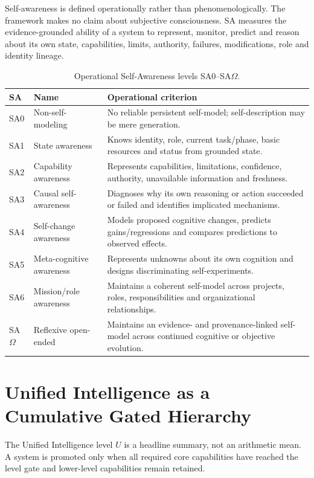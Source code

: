 \documentclass[11pt]{article}
\theoremstyle{definition}
\newcommand{\Om}{\ensuremath{\Omega}}
\begin{document}
Self-awareness is defined operationally rather than phenomenologically. The framework makes no claim about subjective consciousness. SA measures the evidence-grounded ability of a system to represent, monitor, predict and reason about its own state, capabilities, limits, authority, failures, modifications, role and identity lineage.

\begin{table}[!htbp]
\centering\small
\begin{tabularx}{\textwidth}{@{}llY@{}}
\toprule
SA & Name & Operational criterion \\
\midrule
SA0 & Non-self-modeling & No reliable persistent self-model; self-description may be mere generation. \\
SA1 & State awareness & Knows identity, role, current task/phase, basic resources and status from grounded state. \\
SA2 & Capability awareness & Represents capabilities, limitations, confidence, authority, unavailable information and freshness. \\
SA3 & Causal self-awareness & Diagnoses why its own reasoning or action succeeded or failed and identifies implicated mechanisms. \\
SA4 & Self-change awareness & Models proposed cognitive changes, predicts gains/regressions and compares predictions to observed effects. \\
SA5 & Meta-cognitive awareness & Represents unknowns about its own cognition and designs discriminating self-experiments. \\
SA6 & Mission/role awareness & Maintains a coherent self-model across projects, roles, responsibilities and organizational relationships. \\
SA\Om{} & Reflexive open-ended & Maintains an evidence- and provenance-linked self-model across continued cognitive or objective evolution. \\
\bottomrule
\end{tabularx}
\caption{Operational Self-Awareness levels SA0--SA\Om{}.}
\label{tab:sa}
\end{table}

\section{Unified Intelligence as a Cumulative Gated Hierarchy}

The Unified Intelligence level $U$ is a headline summary, not an arithmetic mean. A system is promoted only when all required core capabilities have reached the level gate and lower-level capabilities remain retained.
\end{document}
